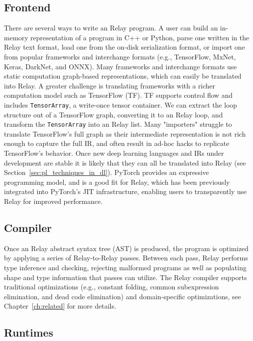 \subsection{Frontend}

There are several ways to write an Relay program.
A user can build an in-memory representation of
    a program in C++ or Python,
    parse one written in the Relay text format,
    load one from the on-disk serialization format,
    or import one from popular frameworks and interchange formats
    (e.g., TensorFlow, MxNet, Keras, DarkNet, and ONNX).
Many frameworks and interchange formats use static computation graph-based representations,
    which can easily be translated into Relay.
A greater challenge is translating frameworks
    with a richer computation model such as TensorFlow (TF).
TF supports control flow and includes \verb|TensorArray|, a write-once
    tensor container.
We can extract the loop structure out of a TensorFlow graph, converting
    it to an Relay loop, and transform the \verb|TensorArray| into an Relay list.
Many "importers" struggle to translate TensorFlow's full graph as their intermediate representation
  is not rich enough to capture the full IR, and often result in ad-hoc hacks to replicate
  TensorFlow's behavior.
Once new deep learning languages and IRs under development
    are stable it is likely that they can all be translated into Relay (see
    Section~\ref{sec:pl_techniques_in_dl}).
PyTorch provides an expressive programming model, and is a good fit
    for Relay, which has been previously integrated into PyTorch's
    JIT infrastructure, enabling users to transparently use Relay for improved performance.

\subsection{Compiler}
Once an Relay abstract syntax tree (AST) is produced,
    the program is optimized by applying a series of Relay-to-Relay
    passes.
Between each pass, Relay performs type inference and checking,
    rejecting malformed programs as well as populating shape and type
    information that passes can utilize.
The Relay compiler supports traditional optimizations
    (e.g., constant folding, common subexpression elimination, and dead code elimination)
    and domain-specific optimizations, see Chapter~\ref{ch:related} for more details.

\subsection{Runtimes}


